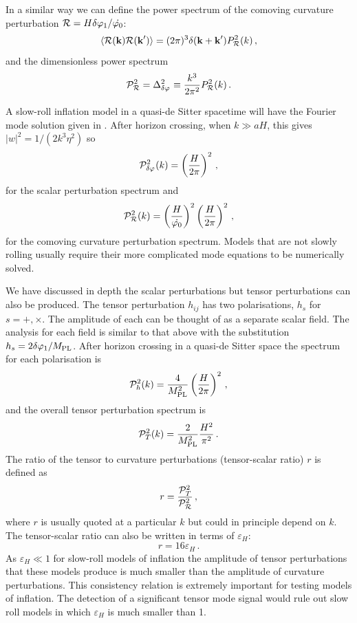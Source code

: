 In a similar way we can define the power spectrum of the comoving curvature
perturbation $\mathcal{R} = H\delta\varphi_{1}/\dot{\varphi_0}$:
% 
\begin{equation}
 \label{eq:Prdefn-intro}
 \langle \mathcal{R}(\textbf{k}) \mathcal{R}(\textbf{k}') \rangle 
   = (2\pi)^3 \delta(\textbf{k} + \textbf{k}') P_{\mathcal{R}}^2 (k)\,,
\end{equation}
%
and the dimensionless power spectrum
% 
\begin{equation}
 \mathcal{P}_{\mathcal{R}}^2 = \Delta^2_{\delta\varphi_{}} \equiv \frac{k^3}{2\pi^2}
P_{\mathcal{R}}^2(k)\,.
\end{equation}

A slow-roll inflation model in a quasi-de Sitter spacetime will have the
Fourier mode solution given in . 
After horizon crossing, when $k\gg aH$, this gives $|w|^2 = 1/(2k^3 \eta^2)$ so 
% 
\begin{equation}
\label{eq:pphi-intro}
 \mathcal{P}_{\delta\varphi_{}}^2(k) = \left(\frac{H}{2\pi}\right)^2 \,,
\end{equation}
% 
for the scalar perturbation spectrum and
% 
\begin{equation}
 \mathcal{P}_{\mathcal{R}}^2 (k) = \left(\frac{H}{\dot{\varphi_0}}\right)^2 \left(\frac{H}{2\pi}\right)^2\,,
\end{equation}
% 
for the comoving curvature perturbation spectrum. Models that are not
slowly rolling usually require their more complicated mode equations to be
numerically solved. 

We have discussed in depth the scalar perturbations but tensor perturbations
can also be produced. The tensor perturbation $h_{ij}$
has two polarisations, $h_s$ for $s=+, \times$. The amplitude of
each can be thought of as a separate scalar field. The analysis for each field
is similar to that above with the substitution $h_s= 2\delta\varphi_{1}/M_{\mathrm{PL}}$. After horizon
crossing in a quasi-de Sitter space the spectrum for each polarisation is
% 
\begin{equation}
 \mathcal{P}_h^2(k) = \frac{4}{M_{\mathrm{PL}}^2} \left(\frac{H}{2\pi}\right)^2\,,
\end{equation}
% 
and the overall tensor perturbation spectrum is
% 
\begin{equation}
 \label{eq:Ptdefn-intro}
\mathcal{P}_T^2(k) = \frac{2}{M_{\mathrm{PL}}^2} \frac{H^2}{\pi^2}\,.
\end{equation}
The ratio of the tensor to curvature perturbations (tensor-scalar ratio) $r$ is
defined as 
% 
\begin{equation}
 r = \frac{\mathcal{P}_T^2}{\mathcal{P}_{\mathcal{R}}^2 }\,,
\end{equation}
% 
where $r$ is usually quoted at a particular $k$ but could in principle depend
on $k$. The tensor-scalar ratio can also be written in terms of $\varepsilon_H$:
% 
\begin{equation}
\label{eq:rslowroll-intro}
 r = 16 \varepsilon_H\,.
\end{equation}
As $\varepsilon_H\ll1$ for slow-roll models of inflation the amplitude of tensor
perturbations that these models produce is much smaller than the amplitude of
curvature perturbations. This consistency relation is extremely important for
testing models of inflation. The detection of a significant tensor mode signal
would rule out slow roll models in which $\varepsilon_H$ is much smaller than 1.



